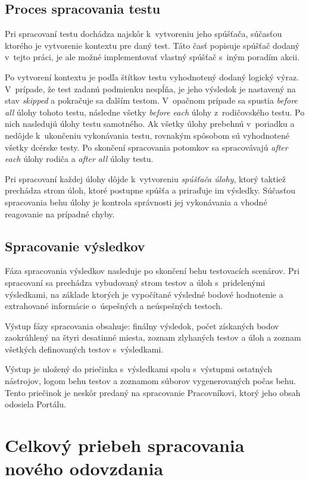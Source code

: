 \documentclass[
  digital, %
  oneside, %
  table,   %
  lof,     %
  lot,   %
]{fithesis3}
\begin{document}
\subsection{Proces spracovania testu}
\label{design-runner}

Pri spracovaní testu dochádza najskôr k~vytvoreniu jeho spúšťača, súčasťou ktorého je vytvorenie kontextu pre daný test. Táto časť popisuje spúšťač dodaný v~tejto práci, je ale možné implementovať vlastný spúšťač s~iným poradím akcii. 

Po vytvorení kontextu je podľa štítkov testu vyhodnotený dodaný logický výraz. V~prípade, že test zadanú podmienku nespĺňa, je jeho výsledok je nastavený na stav \emph{skipped} a pokračuje sa ďalším testom. V~opačnom prípade sa spustia \emph{before all} úlohy tohoto testu, následne všetky \emph{before each} úlohy z~rodičovského testu. Po nich nasledujú úlohy testu samotného. Ak všetky úlohy prebehnú v~poriadku a nedôjde k~ukončeniu vykonávania testu, rovnakým spôsobom sú vyhodnotené všetky dcérske testy. Po skončení spracovania potomkov sa spracovávajú \emph{after each} úlohy rodiča a \emph{after all} úlohy testu.

Pri spracovaní každej úlohy dôjde k~vytvoreniu \emph{spúšťača úlohy}, ktorý taktiež prechádza strom úloh, ktoré postupne spúšťa a priraďuje im výsledky. Súčasťou spracovania behu úlohy je kontrola správnosti jej vykonávania a vhodné reagovanie na prípadné chyby.

\subsection{Spracovanie výsledkov}

Fáza spracovania výsledkov nasleduje po skončení behu testovacích scenárov. Pri spracovaní sa prechádza vybudovaný strom testov a úloh s~pridelenými výsledkami, na základe ktorých je vypočítané výsledné bodové hodnotenie a extrahované informácie o~úspešných a neúspešných testoch.

Výstup fázy spracovania obsahuje: finálny výsledok, počet získaných bodov zaokrúhlený na štyri desatinné miesta, zoznam zlyhaných testov a úloh a zoznam všetkých definovaných testov s~výsledkami.

Výstup je uložený do priečinka s~výsledkami spolu s~výstupmi ostatných nástrojov, logom behu testov a zoznamom súborov vygenerovaných počas behu. Tento priečinok je neskôr predaný na spracovanie Pracovníkovi, ktorý jeho obsah odosiela Portálu.

\section{Celkový priebeh spracovania nového odovzdania}
\end{document}
